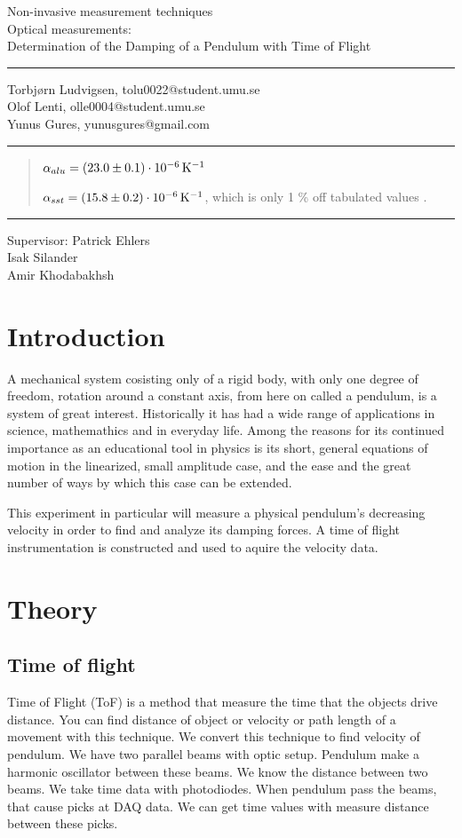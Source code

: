 \documentclass[11pt, a4paper]{article}
\date{\todayswe}
\makeatletter
\def\contacts{Torbjørn Ludvigsen, tolu0022@student.umu.se\\Olof Lenti, olle0004@student.umu.se\\
Yunus Gures, yunusgures@gmail.com}
\def\course{Non-invasive measurement techniques}
\def\lab{Optical measurements:\\Determination of the Damping of a Pendulum with Time of Flight}
\def\supervisors{Patrick Ehlers\\Isak Silander\\ Amir Khodabakhsh}
\makeatother
\begin{document}
\pagestyle{fancy}
\begin{titlepage}
	\begin{center}
		\course\\
		\Large{\lab}\vspace{2mm}
		\hrule\vspace{2mm}
		\tiny{\contacts}\vspace{2mm}
		\hrule
	\end{center}
	\vspace{4mm}

	\begin{abstract}

  $\alpha_{alu} =\unit[(23.0 \pm 0.1)\cdot10^{-6}]{K^{-1}}$ 

  $\alpha_{sst} = \unit[(15.8 \pm 0.2)\cdot10^{-6}]{K^{-1}}$, 
    which is only 1 \% off tabulated values \cite{ph, thex}.

	\end{abstract}
	\vfill
	\hrule\vspace{2mm}
	\centering
		\tiny{Supervisor: \supervisors}
\end{titlepage}

\pagestyle{plain}
\vspace{2cm}
\section{Introduction}
A mechanical system cosisting only of a rigid body, with only one degree of 
freedom, rotation around a constant axis, from here on called a pendulum, is 
a system of great interest. Historically it has had a wide range of
applications in science, mathemathics and in everyday life. Among the reasons for
its continued importance as an educational tool in physics is its short, general 
equations of
motion in the linearized, small amplitude case, and the ease and the great number 
of ways by which this case can be extended.

This experiment in particular will measure a physical pendulum's decreasing velocity
in order to find and analyze its damping forces. A time of flight instrumentation
is constructed and used to aquire the velocity data.

\section{Theory}
\subsection{Time of flight}
Time of Flight (ToF) is a method that measure the time that the objects drive distance. 
You can find distance of object or velocity or path length of a movement with this technique.
We convert this technique to find velocity of pendulum. We have two parallel beams 
with optic setup. Pendulum make a harmonic oscillator between these beams. We know the 
distance between two beams. We take time data with photodiodes. When pendulum pass the 
beams, that cause picks at DAQ data. We can get time values with measure distance between 
these picks.
\end{document}
